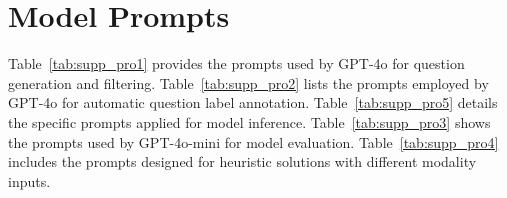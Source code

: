 \begin{table}[h]
\caption{\small Judgments of human and GPT-4o mini.}
\label{tab:re_tab1}
\setlength{\tabcolsep}{.4em}
\centering
\fontsize{6}{8}\selectfont
{}
\end{table}

\section{Model Prompts}
\label{sup:prompt}
Table~\ref{tab:supp_pro1} provides the prompts used by GPT-4o for question generation and filtering. Table~\ref{tab:supp_pro2} lists the prompts employed by GPT-4o for automatic question label annotation. Table~\ref{tab:supp_pro5} details the specific prompts applied for model inference. Table~\ref{tab:supp_pro3} shows the prompts used by GPT-4o-mini for model evaluation.  Table~\ref{tab:supp_pro4} includes the prompts designed for heuristic solutions with different modality inputs. 




